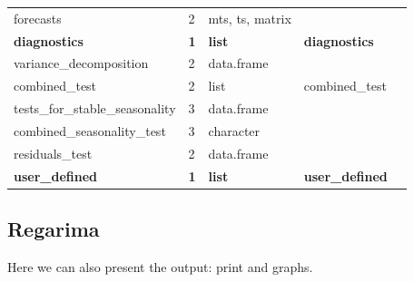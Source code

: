 \documentclass[article]{jss}
\begin{document}
\begin{longtable}{lllll}
\hspace{2em}forecasts & 2 & mts, ts, matrix &  & \\
\textbf{\hspace{1em}diagnostics} & \textbf{1} & \textbf{list} & \textbf{diagnostics} & \textbf{}\\
\addlinespace
\hspace{2em}variance\_decomposition & 2 & data.frame &  & \\
\hspace{2em}combined\_test & 2 & list & combined\_test & \\
\hspace{3em}tests\_for\_stable\_seasonality & 3 & data.frame &  & \\
\hspace{3em}combined\_seasonality\_test & 3 & character &  & \\
\hspace{2em}residuals\_test & 2 & data.frame &  & \\
\addlinespace
\textbf{\hspace{1em}user\_defined} & \textbf{1} & \textbf{list} & \textbf{user\_defined} & \textbf{}\\
\bottomrule
\end{longtable}
\endgroup{}

\hypertarget{regarima}{%
\subsection{Regarima}\label{regarima}}

Here we can also present the output: print and graphs.
\end{document}
